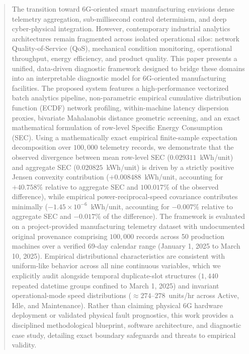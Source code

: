 \documentclass[journal]{IEEEtran}
\begin{document}
\begin{abstract}
The transition toward 6G-oriented smart manufacturing envisions dense telemetry aggregation, sub-millisecond control determinism, and deep cyber-physical integration. However, contemporary industrial analytics architectures remain fragmented across isolated operational silos: network Quality-of-Service (QoS), mechanical condition monitoring, operational throughput, energy efficiency, and product quality. This paper presents a unified, data-driven diagnostic framework designed to bridge these domains into an interpretable diagnostic model for 6G-oriented manufacturing facilities. The proposed system features a high-performance vectorized batch analytics pipeline, non-parametric empirical cumulative distribution function (ECDF) network profiling, within-machine latency dispersion proxies, bivariate Mahalanobis distance geometric screening, and an exact mathematical formulation of row-level Specific Energy Consumption (SEC). Using a mathematically exact empirical finite-sample expectation decomposition over $100{,}000$ telemetry records, we demonstrate that the observed divergence between mean row-level SEC ($0.029311$~kWh/unit) and aggregate SEC ($0.020825$~kWh/unit) is driven by a strictly positive Jensen convexity contribution ($+0.008488$~kWh/unit, accounting for $+40.758\%$ relative to aggregate SEC and $100.017\%$ of the observed difference), while empirical power-reciprocal-speed covariance contributes minimally ($-1.45 \times 10^{-6}$~kWh/unit, accounting for $-0.007\%$ relative to aggregate SEC and $-0.017\%$ of the difference). The framework is evaluated on a project-provided manufacturing telemetry dataset with undocumented original provenance comprising $100{,}000$ records across 50 production machines over a verified 69-day calendar range (January 1, 2025 to March 10, 2025). Empirical distributional characteristics are consistent with uniform-like behavior across all nine continuous variables, which we explicitly audit alongside temporal duplicate-slot structures ($1{,}440$ repeated datetime groups confined to March 1, 2025) and invariant operational-mode speed distributions ($\approx 274$--$278$~units/hr across Active, Idle, and Maintenance). Rather than claiming physical 6G hardware deployment or validated physical fault prognostics, this work provides a disciplined methodological blueprint, software architecture, and diagnostic case study, detailing exact boundary safeguards and threats to empirical validity.
\end{abstract}
\end{document}
